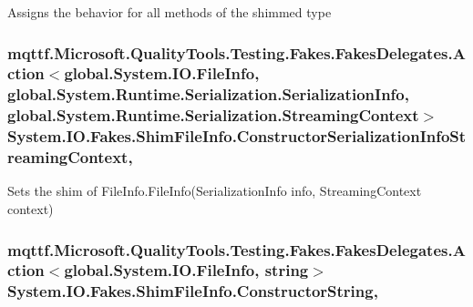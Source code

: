Assigns the behavior for all methods of the shimmed type

\hypertarget{class_system_1_1_i_o_1_1_fakes_1_1_shim_file_info_a6fe7345c2c346f99c9ea67d94c8ffb1f}{
\subsubsection[{Constructor\-Serialization\-Info\-Streaming\-Context}]{\setlength{\rightskip}{0pt plus 5cm}mqttf.\-Microsoft.\-Quality\-Tools.\-Testing.\-Fakes.\-Fakes\-Delegates.\-Action$<$global.\-System.\-I\-O.\-File\-Info, global.\-System.\-Runtime.\-Serialization.\-Serialization\-Info, global.\-System.\-Runtime.\-Serialization.\-Streaming\-Context$>$ System.\-I\-O.\-Fakes.\-Shim\-File\-Info.\-Constructor\-Serialization\-Info\-Streaming\-Context\hspace{0.3cm}{\ttfamily [static]}, {\ttfamily [set]}}}\label{class_system_1_1_i_o_1_1_fakes_1_1_shim_file_info_a6fe7345c2c346f99c9ea67d94c8ffb1f}


Sets the shim of File\-Info.\-File\-Info(\-Serialization\-Info info, Streaming\-Context context)

\hypertarget{class_system_1_1_i_o_1_1_fakes_1_1_shim_file_info_a8ac843a6c7e1351c9f96cb581d63be73}{
\subsubsection[{Constructor\-String}]{\setlength{\rightskip}{0pt plus 5cm}mqttf.\-Microsoft.\-Quality\-Tools.\-Testing.\-Fakes.\-Fakes\-Delegates.\-Action$<$global.\-System.\-I\-O.\-File\-Info, string$>$ System.\-I\-O.\-Fakes.\-Shim\-File\-Info.\-Constructor\-String\hspace{0.3cm}{\ttfamily [static]}, {\ttfamily [set]}}}\label{class_system_1_1_i_o_1_1_fakes_1_1_shim_file_info_a8ac843a6c7e1351c9f96cb581d63be73}


